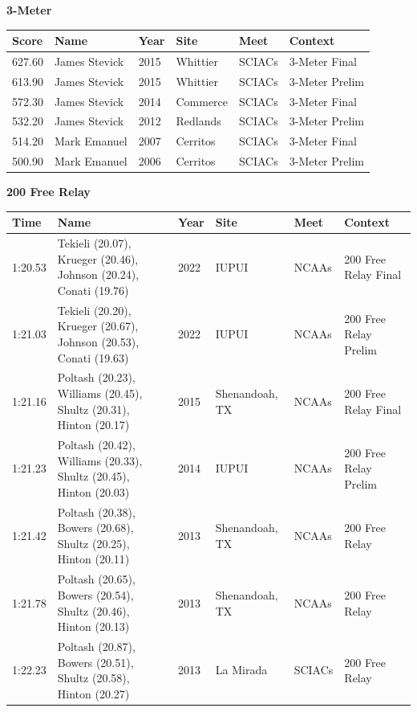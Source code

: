 \noindent\begin{minipage}[t]{0.98\textwidth}
\centering
\textbf{\textcolor{teamprimary}{3-Meter}}\par
\vspace{0.5em}
\centering
\small
\renewcommand{\arraystretch}{1.0}
\setlength{\tabcolsep}{4pt}
\begin{tabular}{@{}p{2.0cm}p{3.2cm}p{1.2cm}p{2.0cm}p{2.0cm}p{2.5cm}@{}}
\toprule
\textbf{Score} & \textbf{Name} & \textbf{Year} & \textbf{Site} & \textbf{Meet} & \textbf{Context} \\
\midrule
627.60 & James Stevick & 2015 & Whittier & SCIACs & 3-Meter Final \\
613.90 & James Stevick & 2015 & Whittier & SCIACs & 3-Meter Prelim \\
572.30 & James Stevick & 2014 & Commerce & SCIACs & 3-Meter Final \\
532.20 & James Stevick & 2012 & Redlands & SCIACs & 3-Meter Prelim \\
514.20 & Mark Emanuel & 2007 & Cerritos & SCIACs & 3-Meter Final \\
500.90 & Mark Emanuel & 2006 & Cerritos & SCIACs & 3-Meter Prelim \\
\bottomrule
\end{tabular}
\end{minipage}
\vspace{1.2em}
\noindent\begin{minipage}[t]{0.98\textwidth}
\centering
\textbf{\textcolor{teamprimary}{200 Free Relay}}\par
\vspace{0.5em}
\centering
\small
\renewcommand{\arraystretch}{1.0}
\setlength{\tabcolsep}{4pt}
\begin{tabular}{@{}p{2.0cm}p{3.2cm}p{1.2cm}p{2.0cm}p{2.0cm}p{2.5cm}@{}}
\toprule
\textbf{Time} & \textbf{Name} & \textbf{Year} & \textbf{Site} & \textbf{Meet} & \textbf{Context} \\
\midrule
1:20.53 & Tekieli (20.07), Krueger (20.46), Johnson (20.24), Conati (19.76) & 2022 & IUPUI & NCAAs & 200 Free Relay Final \\
1:21.03 & Tekieli (20.20), Krueger (20.67), Johnson (20.53), Conati (19.63) & 2022 & IUPUI & NCAAs & 200 Free Relay Prelim \\
1:21.16 & Poltash (20.23), Williams (20.45), Shultz (20.31), Hinton (20.17) & 2015 & Shenandoah, TX & NCAAs & 200 Free Relay Final \\
1:21.23 & Poltash (20.42), Williams (20.33), Shultz (20.45), Hinton (20.03) & 2014 & IUPUI & NCAAs & 200 Free Relay Prelim \\
1:21.42 & Poltash (20.38), Bowers (20.68), Shultz (20.25), Hinton (20.11) & 2013 & Shenandoah, TX & NCAAs & 200 Free Relay \\
1:21.78 & Poltash (20.65), Bowers (20.54), Shultz (20.46), Hinton (20.13) & 2013 & Shenandoah, TX & NCAAs & 200 Free Relay \\
1:22.23 & Poltash (20.87), Bowers (20.51), Shultz (20.58), Hinton (20.27) & 2013 & La Mirada & SCIACs & 200 Free Relay \\
\bottomrule
\end{tabular}
\end{minipage}
